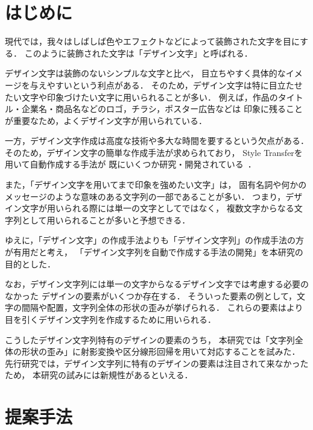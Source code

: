 \documentclass[autodetect-engine,dvi=dvipdfmx,ja=standard,a4j,jbase=10.5pt,twoside,twocolumn,magstyle=nomag*]{bxjsarticle}
\begin{document}
\maketitle
\section{はじめに}\label{sec:introduction}
現代では，我々はしばしば色やエフェクトなどによって装飾された文字を目にする．
このように装飾された文字は「デザイン文字」と呼ばれる．

デザイン文字は装飾のないシンプルな文字と比べ，
目立ちやすく具体的なイメージを与えやすいという利点がある．
そのため，デザイン文字は特に目立たせたい文字や印象づけたい文字に用いられることが多い．
例えば，作品のタイトル・企業名・商品名などのロゴ，チラシ，ポスター広告などは
印象に残ることが重要なため，よくデザイン文字が用いられている．

一方，デザイン文字作成は高度な技術や多大な時間を要するという欠点がある．
そのため，デザイン文字の簡単な作成手法が求められており，
Style Transferを用いて自動作成する手法が
既にいくつか研究・開発されている~\cite{Yang_2017_CVPR,Yang2019Controllable,typography2019}．

また，「デザイン文字を用いてまで印象を強めたい文字」は，
固有名詞や何かのメッセージのような意味のある文字列の一部であることが多い．
つまり，デザイン文字が用いられる際には単一の文字としてではなく，
複数文字からなる文字列として用いられることが多いと予想できる．

ゆえに，「デザイン文字」の作成手法よりも「デザイン文字列」の作成手法の方が有用だと考え，
「デザイン文字列を自動で作成する手法の開発」を本研究の目的とした．

なお，デザイン文字列には単一の文字からなるデザイン文字では考慮する必要のなかった
デザインの要素がいくつか存在する．
そういった要素の例として，文字の間隔や配置，文字列全体の形状の歪みが挙げられる．
これらの要素はより目を引くデザイン文字列を作成するために用いられる．

こうしたデザイン文字列特有のデザインの要素のうち，
本研究では「文字列全体の形状の歪み」に射影変換や区分線形回帰を用いて対応することを試みた．
先行研究では，デザイン文字列に特有のデザインの要素は注目されて来なかったため，
本研究の試みには新規性があるといえる．

\section{提案手法}\label{sec:methods}
\end{document}
